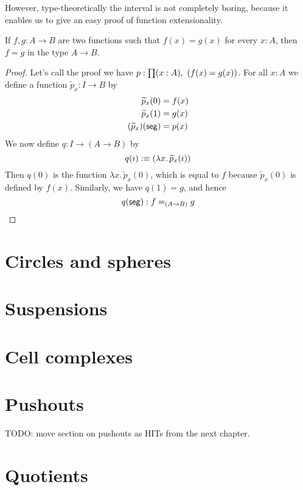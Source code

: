 However, type-theoretically the interval is not completely boring, because it enables us to give an easy proof of function extensionality.

\begin{lem}
  If $f,g:A\to{}B$ are two functions such that $f(x)=g(x)$ for every $x:A$, then
  $f=g$ in the type $A\to{}B$.
\end{lem}

\begin{proof}
  Let's call the proof we have $p:\prd{x:A}(f(x)=g(x))$. For all $x:A$ we define
  a function $\widetilde{p}_x:I\to{}B$ by
  \begin{align*}
    \widetilde{p}_x(0) &= f(x) \\
    \widetilde{p}_x(1) &= g(x) \\
    {(\widetilde{p}_x)}\!\left({\mathsf{seg}}\right) &= p(x)
  \end{align*}
  We now define $q:I\to(A\to{}B)$ by
  \[q(i)\vcentcolon\equiv(\lambda{}x.\,\widetilde{p}_x(i))\]
  Then $q(0)$ is the function $\lambda{}x.\,\widetilde{p}_x(0)$, which is equal to $f$ because $\widetilde{p}_x(0)$ is defined by $f(x)$.
  Similarly, we have $q(1)=g$, and hence
  \[{q}\!\left({\mathsf{seg}}\right):f=_{(A\to{}B)}g \qedhere\]
\end{proof}

\section{Circles and spheres}
\label{sec:circle}

\section{Suspensions}
\label{sec:suspension}

\section{Cell complexes}
\label{sec:cell-complexes}

\section{Pushouts}
\label{sec:colimits}

TODO: move section on pushouts as HITs from the next chapter.

\section{Quotients}
\label{sec:quotients}

